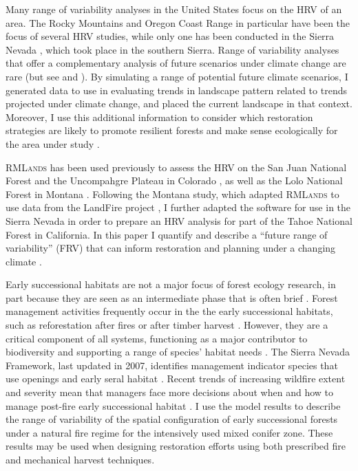 Many range of variability analyses in the United States focus on the HRV of an area. The Rocky Mountains and Oregon Coast Range in particular have been the focus of several HRV studies, while only one has been conducted in the Sierra Nevada \citep{Miller1999}, which took place in the southern Sierra. Range of variability analyses that offer a complementary analysis of future scenarios under climate change are rare (but see \cite{Keane2008} and \cite{Duveneck2014}). By simulating a range of potential future climate scenarios, I generated data to use in evaluating trends in landscape pattern related to trends projected under climate change, and placed the current landscape in that context. Moreover, I use this additional information to consider which restoration strategies are likely to promote resilient forests and make sense ecologically for the area under study \citep{Duncan2010}.

\textsc{RMLands} has been used previously to assess the HRV on the San Juan National Forest and the Uncompahgre Plateau in Colorado \citep{McGarigal2005,McGarigal2005a,Romme2009}, as well as the Lolo National Forest in Montana \citep{Cushman2011}. Following the Montana study, which adapted \textsc{RMLands} to use data from the LandFire project \citep{Landfire2007}, I further adapted the software for use in the Sierra Nevada in order to prepare an HRV analysis for part of the Tahoe National Forest in California. In this paper I quantify and describe a ``future range of variability'' (FRV) that can inform restoration and planning under a changing climate \citep{Fule2008,Duncan2010}.

Early successional habitats are not a major focus of forest ecology research, in part because they are seen as an intermediate phase that is often brief \citep{Swanson2011}. Forest management activities frequently occur in the the early successional habitats, such as reforestation after fires or after timber harvest \citep{Stephens2010}. However, they are a critical component of all systems, functioning as a major contributor to biodiversity and supporting a range of species' habitat needs \citep{Chang1995,Hutto2008,Swanson2011}. The Sierra Nevada Framework, last updated in 2007, identifies management indicator species that use openings and early seral habitat \citep{USDAForestService2004,USDAForestService2007}. Recent trends of increasing wildfire extent and severity mean that managers face more decisions about when and how to manage post-fire early successional habitat \citep{Stephens2013,Dellasala2014}. I use the model results to describe the range of variability of the spatial configuration of early successional forests under a natural fire regime for the intensively used mixed conifer zone. These results may be used when designing restoration efforts using both prescribed fire and mechanical harvest techniques. 


